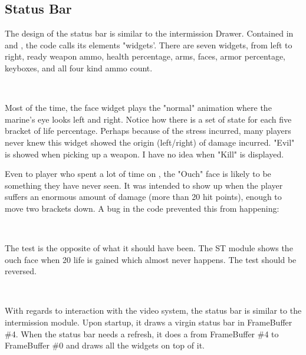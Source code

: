 \par

\subsection{Status Bar}
The design of the status bar is similar to the intermission Drawer. Contained in  and , the code calls its elements "widgets'. There are seven widgets, from left to right, ready weapon ammo, health percentage, arms, faces, armor percentage, keyboxes, and all four kind ammo count.\\
\par
{}
\par

\par
{}\\
\par
Most of the time, the face widget plays the "normal" animation where the marine's eye looks left and right. Notice how there is a set of state for each five bracket of life percentage. Perhaps because of the stress incurred, many players never knew this widget showed the origin (left/right) of damage incurred. "Evil" is showed when picking up a weapon. I have no idea when "Kill" is displayed.\\
\par
Even to player who spent a lot of time on \doom, the "Ouch" face is likely to be something they have never seen. It was intended to show up when the player suffers an enormous amount of damage (more than 20 hit points), enough to move two brackets down. A bug in the code prevented this from happening:\\
\par
{}\\
\par
The test is the opposite of what it should have been. The ST module shows the ouch face when 20 life is gained which almost never happens. The test should be reversed.\\
\par
{}\\
\par
With regards to interaction with the video system, the status bar is similar to the intermission module. Upon startup, it draws a virgin status bar in FrameBuffer \#4. When the status bar needs a refresh, it does a  from FrameBuffer \#4 to FrameBuffer \#0 and draws all the widgets on top of it.\\
\par
{}


